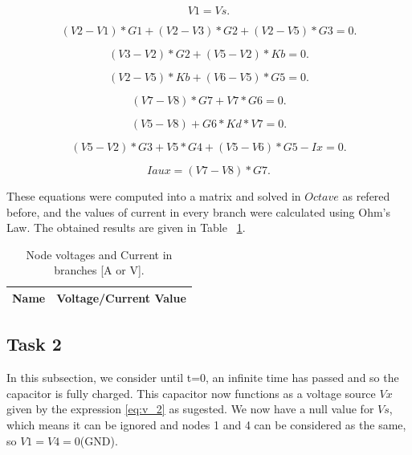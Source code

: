 \begin{equation}
  V1 = Vs.
  \label{eq:n1}
\end{equation}

\begin{equation}
  (V2 - V1)*G1 + (V2 - V3)*G2 + (V2 - V5)*G3 = 0.
  \label{eq:n2}
\end{equation}

\begin{equation}
  (V3 - V2)*G2	+ (V5 - V2)*Kb = 0.
  \label{eq:n3}
\end{equation}

\begin{equation}
  (V2 - V5)*Kb + (V6 - V5)*G5 = 0.
  \label{eq:n4}
\end{equation}

\begin{equation}
  (V7 - V8)*G7 + V7*G6 = 0.
  \label{eq:n5}
\end{equation}

\begin{equation}
  (V5 - V8) + G6*Kd*V7 = 0.
  \label{eq:n6}
\end{equation}

\begin{equation}
  (V5 - V2)*G3	+ V5*G4 + (V5 - V6)*G5 - Ix = 0.
  \label{eq:n7}
\end{equation}

\begin{equation}
  Iaux = (V7 - V8)*G7.
  \label{eq:n8}
\end{equation}


These equations were computed into a matrix and solved in $Octave$ as refered before, and the values of current in every branch were calculated using Ohm's Law. The obtained results are given in Table ~\ref{tab:r1}.


\begin{table}[h]
  \centering
  \begin{tabular}{|l|r|}
    \hline    
    {\bf Name} & {\bf Voltage/Current Value}\\ \hline
    
  \end{tabular}
  \caption{Node voltages and Current in branches [A or V].}
  \label{tab:r1}
\end{table}


\subsection{Task 2}
In this subsection, we consider until t=0, an infinite time has passed and so the capacitor is fully charged. This capacitor now functions as a voltage source $Vx$ given by the expression \ref{eq:v_2} as sugested. We now have a null value for $Vs$, which means it can be ignored and nodes 1 and 4 can be considered as the same, so $V1=V4=0$(GND).

